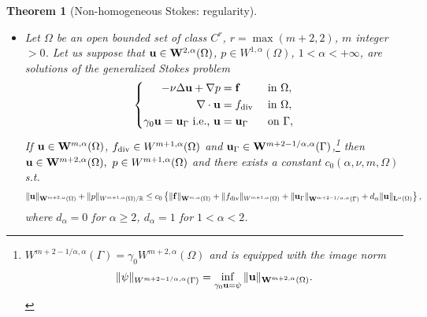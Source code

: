 \documentclass[oneside]{book}
\numberwithin{equation}{section}
\newtheorem{theorem}{Theorem}[section]
\begin{document}
\begin{theorem}[Non-homogeneous Stokes: regularity]
    \begin{itemize}
        \item[(i)] Let $\Omega$ be an open bounded set of class $C^r$, $r = \max(m + 2,2)$, $m$ integer $> 0$. Let us suppose that ${\bf u}\in{\bf W}^{2,\alpha}(\Omega)$, $p\in W^{1,\alpha}(\Omega)$, $1 < \alpha < +\infty$, are solutions of the generalized Stokes problem
        \begin{equation*}
            \left\{\begin{split}
                -\nu\Delta{\bf u} + \nabla p &= {\bf f} &&\mbox{ in } \Omega,\\
                \nabla\cdot{\bf u} &= f_{\rm div} &&\mbox{ in } \Omega,\\
                \gamma_0{\bf u} = {\bf u}_\Gamma \mbox{ i.e., } {\bf u} &= {\bf u}_\Gamma &&\mbox{ on } \Gamma,
            \end{split}\right.
        \end{equation*}
        If ${\bf u}\in{\bf W}^{m,\alpha}(\Omega)$, $f_{\rm div}\in W^{m+1,\alpha}(\Omega)$ and ${\bf u}_\Gamma\in{\bf W}^{m + 2 - 1/\alpha,\alpha}(\Gamma)$,\footnote{$W^{m + 2 - 1/\alpha,\alpha}(\Gamma) = \gamma_0W^{m+2,\alpha}(\Omega)$ and is equipped with the image norm
        \begin{align*}
            \|\psi\|_{W^{m + 2 - 1/\alpha,\alpha}(\Gamma)} = \inf_{\gamma_0{\bf u} = \psi} \|{\bf u}\|_{{\bf W}^{m+2,\alpha}(\Omega)}.
        \end{align*}} then ${\bf u}\in{\bf W}^{m+2,\alpha}(\Omega),\ p\in W^{m+1,\alpha}(\Omega)$ and there exists a constant $c_0(\alpha,\nu,m,\Omega)$ s.t.
        \begin{align}
            \label{Temam2000 (2.46)}
            \|{\bf u}\|_{{\bf W}^{m+2,\alpha}(\Omega)} + \|p\|_{W^{m+1,\alpha}(\Omega)/\mathbb{R}}\le c_0\left\{\|{\bf f}\|_{{\bf W}^{m,\alpha}(\Omega)} + \|f_{\rm div}\|_{W^{m+1,\alpha}(\Omega)} + \|{\bf u}_\Gamma\|_{{\bf W}^{m + 2 - 1/\alpha,\alpha}(\Gamma)} + d_\alpha\|{\bf u}\|_{{\bf L}^\alpha(\Omega)}\right\},
        \end{align}
        where $d_\alpha = 0$ for $\alpha\ge 2$, $d_\alpha = 1$ for $1 < \alpha < 2$.
    \end{itemize}
\end{theorem}
\end{document}
